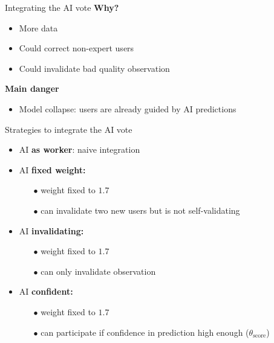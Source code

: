 \begin{frame}{Integrating the AI vote}{}
\textbf{Why?}
\begin{itemize}
    \item More data
    \item Could correct non-expert users
    \item Could invalidate bad quality observation
\end{itemize}
\pause
\vspace{2cm}
\textbf{Main danger}
\begin{itemize}
    \item Model collapse: users are already guided by AI predictions
\end{itemize}
\end{frame}

\begin{frame}{Strategies to integrate the AI vote}{}
\begin{itemize}
    \item<1-> AI \textbf{as worker}: naive integration
    \item<2-> AI \textbf{fixed weight:}
    \begin{itemize}
        \item[$\bullet$]weight fixed to $1.7$
        \item[$\bullet$]can invalidate two new users but is not self-validating
    \end{itemize}
    \item<3-> AI \textbf{invalidating:}
     \begin{itemize}
        \item[$\bullet$]weight fixed to $1.7$
        \item[$\bullet$]can only invalidate observation
    \end{itemize}
    \item<4-> AI \textbf{confident:}
    \begin{itemize}
        \item[$\bullet$]weight fixed to $1.7$
        \item[$\bullet$]can participate if confidence in prediction high enough ($\theta_{\text{score}}$)
    \end{itemize}
\end{itemize}
\end{frame}

